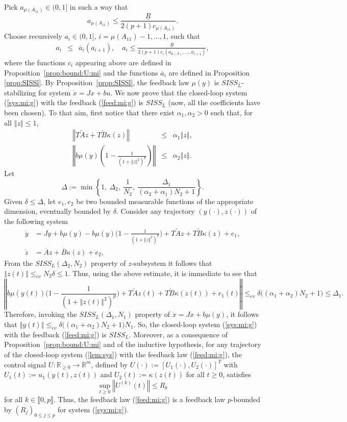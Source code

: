 \documentclass[letterpaper, 10pt]{article}
\newcommand{\rref}[1]{(\ref{#1})}
\newcommand{\norme}[1]{\left\Vert #1\right\Vert}
\newcommand{\reels}{\mathbb{R}}
\begin{document}
Pick $a_{\mu(A_{11})} \in (0, 1]$ in such a way that
$$
a_{\mu(A_{11})} \leq \frac{ \underline{R}}{2 (p+1) c_{\mu(A_{11})}}.
$$
Choose recursively $a_i \in (0, 1]$, $i= \mu(A_{11})- 1 , \ldots , 1$, such that
\begin{eqnarray*}
a_{i} & \leq &  \overline{a}_{i} (a_{i+1}), \quad a_{i}  \leq  \frac{\underline{R}}{2(p+1) c_i( a_{\mu(A)} , \ldots , a_{i+1} )},
\end{eqnarray*} 
where the functions $c_i$ appearing above are defined in Proposition~\ref{prop:bound:U:mi} and the functions $ \overline{a}_{i}$ are defined in Proposition \ref{prop:SISSl}.
By Proposition~\ref{prop:SISSl}, the feedback law $\mu(y)$ is $SISS_L$-stabilizing for system $\dot{x}=Jx+bu$. We now prove that the closed-loop system \rref{sys:mi:g} with the feedback \rref{feed:mi:g} is $SISS_L$ (now, all the coefficients have been chosen). To that aim, first notice that there exist $\alpha_1, \alpha_2 >0$ such that, for all $\norme{z}\leq 1$,
\begin{eqnarray*}
\norme{ T \tilde{A}z+ T \tilde{B}\kappa(z) } & \leq & \alpha_1 \norme{z},\\
\norme{b \mu(y) \left( 1 - \frac{1}{(1+\norme{z}^2)^p}\right)} &\leq & \alpha_2 \norme{z}.
\end{eqnarray*}  
Let $$\Delta := \min \left\lbrace 1,\: \Delta_2, \: \frac{1}{N_2} ,\: \frac{\Delta_1}{(\alpha_2 + \alpha_1) N_2 +1 }  \right\rbrace.$$
Given $\delta \leq \Delta$, let $e_1, e_2 $ be two bounded measurable functions of the appropriate dimension, eventually bounded by $\delta$. Consider any trajectory $(y(\cdot) , z(\cdot) )$ of the following system
\begin{align}
\dot{y}&  = J y +b  \mu(y)- b \mu(y) \big( 1 - \frac{1}{(1+\norme{z}^2)^p}\big)  + T \tilde{A}z+ T \tilde{B}\kappa(z)+e_1, \\
\dot{z} & =  \overline{A} z + \overline{B} \kappa(z)+e_2, 
\end{align} From the $SISS_L(\Delta_2, N_2)$ property of $z$-subsystem it follows that $\norme{z(t)} \leq_{ev} N_2 \delta \leq 1$. Thus, using the above estimate, it is immediate to see that $$\norme{b \mu(y(t)) \big( 1 - \frac{1}{(1+\norme{z(t)}^2)^p}\big)  + T \tilde{A}z(t)+ T \tilde{B}\kappa(z(t))+e_1(t)} \leq_{ev} \delta \big((\alpha_1 + \alpha_2) N_2 +1 \big) \leq \Delta_1. $$ Therefore, invoking the $SISS_L(\Delta_1, N_1)$ property of
$\dot{x}=Jx+b\mu(y)$, it follows that $\norme{y(t)}\leq_{ev}\delta \big((\alpha_1 + \alpha_2) N_2 +1 \big) N_1$. So, the closed-loop system \rref{sys:mi:g} with the feedback \rref{feed:mi:g} is $SISS_L$.
Moreover, as a consequence of Proposition~\ref{prop:bound:U:mi} and of the inductive hypothesis, for any trajectory of the closed-loop system \rref{lem:sys} with the feedback law \rref{feed:mi:g}, the control signal $U : \reels_{\geq 0} \rightarrow  \reels^m $, defined by $U(\cdot) := [ U_1(\cdot), U_2(\cdot) ]^T$ with $U_1(t) := u_1 (y(t),z(t)) $ and $U_2(t) := \kappa(z(t))$ for all $t \geq 0$, satisfies $$\sup_{t\geq 0}\norme{U^{(k)}(t)} \leq R_k$$ for all $k \in \llbracket 0 ,p \rrbracket $. Thus, the feedback law \rref{feed:mi:g} is a  feedback law $p$-bounded by $(R_j)_{0 \leq j \leq p}$ for system \rref{sys:mi:g}.
\end{document}
